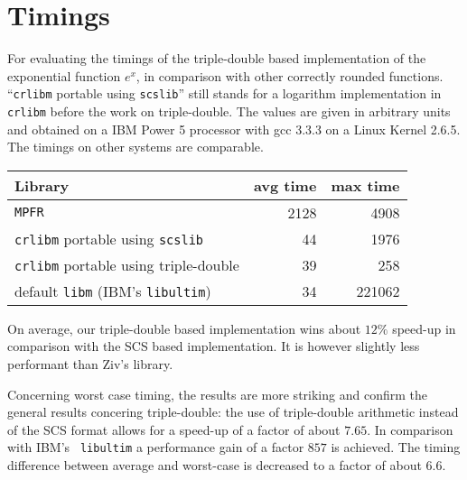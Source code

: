 
\section{Timings}\label{sec:exptiming}
For evaluating the timings of the triple-double based implementation
of the exponential function $e^x$, in comparison with other correctly
rounded functions.  ``{\tt crlibm} portable using {\tt scslib}'' still
stands for a logarithm implementation in {\tt crlibm} before the work
on triple-double. The values are given in arbitrary units and obtained
on a IBM Power 5 processor with gcc 3.3.3 on a Linux Kernel 2.6.5. The
timings on other systems are comparable.
\begin{center}
\begin{tabular}{|l|r|r|}
 \hline
  Library                       &     avg time  & max time \\
 \hline
 \hline
 \texttt{MPFR}   &   2128    & 4908        \\ 
 \hline
 \texttt{crlibm} portable using \texttt{scslib}   &   44    & 1976        \\ 
 \hline
 \texttt{crlibm} portable using triple-double      &        39    & 258        \\ 
 \hline
 default \texttt{libm} (IBM's {\tt libultim})  &        34    & 221062      \\ 
 \hline
\end{tabular}
\end{center}
On average, our triple-double based implementation wins about $12\%$
speed-up in comparison with the SCS based implementation. It is
however slightly less performant than Ziv's library.

Concerning worst case timing, the results are more striking and
confirm the general results concering triple-double: the use of
triple-double arithmetic instead of the SCS format allows for a
speed-up of a factor of about $7.65$. In comparison with IBM's {\tt
libultim} a performance gain of a factor $857$ is achieved. The timing
difference between average and worst-case is decreased to a factor of
about $6.6$.


